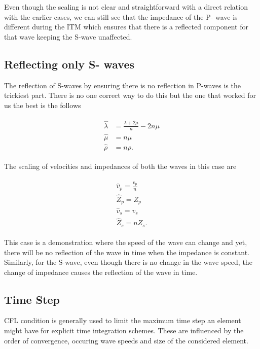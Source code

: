 Even though the scaling is not clear and straightforward with a direct relation with the earlier cases, we can still see that the impedance of the P- wave is different during the \ac{ITM}
which ensures that there is a reflected component for that wave keeping the S-wave unaffected. \\

\subsection{Reflecting only S- waves}

The reflection of S-waves by ensuring there is no reflection in P-waves is the trickiest part. There is no one correct way to do this but the one that worked for us
the best is the follows

\begin{align}
    \begin{split}
        \hat{\lambda} &= \frac{\lambda + 2 \mu}{n} -  2n \mu\\
        \hat{\mu} &= n \mu \\
        \hat{\rho} &= n \rho .
    \end{split}
\end{align}

The scaling of velocities and impedances of both the waves in this case are 

\begin{align}
    \begin{split}
        \hat{v}_p = \frac{v_p}{n} \\
        \hat{Z}_p = Z_p \\
        \hat{v}_s = v_s \\
        \hat{Z}_s = n Z_s .
    \end{split}
\end{align}

This case is a demonstration where the speed of the wave can change and yet, there will be no reflection of the wave in time when the impedance is constant.
Similarly, for the S-wave, even though there is no change in the wave speed, the change of impedance causes the reflection of the wave in time. \\

\subsection{Time Step}
\ac{CFL} condition is generally used to limit the maximum time step an element might have for explicit time integration schemes. These are influenced by the order
of convergence, occuring wave speeds and size of the considered element. \\

